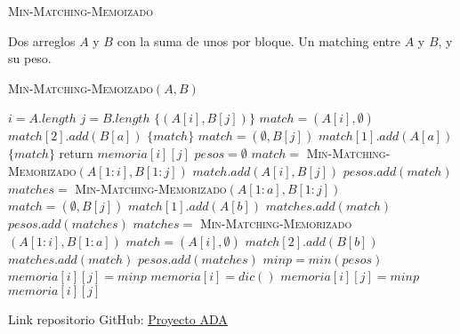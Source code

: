 \documentclass[conference]{IEEEtran}
\begin{document}
\begin{algorithm}
\caption{\textsc{Min-Matching-Memoizado}}
\begin{algorithmic}
\REQUIRE Dos arreglos $A$ y $B$ con la suma de unos por bloque.
\ENSURE Un matching entre $A$ y $B$, y su peso.
\begin{flushleft}
\textsc{Min-Matching-Memoizado}$(A,B)$
\end{flushleft}
    \STATE $i=A.length$
    \STATE $j=B.length$
        \RETURN $\{(A[i],B[j])\}$
            \STATE $match=(A[i],\emptyset)$
                \STATE $match[2].add(B[a])$
            \ENDFOR
            \RETURN $\{match\}$
        \ELSE
            \STATE $match=(\emptyset,B[j])$
                \STATE $match[1].add(A[a])$
            \ENDFOR
            \RETURN $\{match\}$
        \ENDIF
    \ELSE
                return $memoria[i][j]$
            \ENDIF
        \ENDIF
        \STATE $pesos=\emptyset$
        \STATE $match=$ \textsc{Min-Matching-Memorizado}$(A[1:i],B[1:j])$
        \STATE $match.add(A[i],B[j])$
        \STATE $pesos.add(match)$
            \STATE $matches=$ \textsc{Min-Matching-Memorizado}$(A[1:a],B[1:j])$
            \STATE $match=(\emptyset,B[j])$
                \STATE $match[1].add(A[b])$
            \ENDFOR
            \STATE $matches.add(match)$
            \STATE $pesos.add(matches)$
        \ENDFOR
            \STATE $matches=$ \textsc{Min-Matching-Memorizado}$(A[1:i],B[1:a])$
            \STATE $match=(A[i],\emptyset)$
                \STATE $match[2].add(B[b])$
            \ENDFOR
            \STATE $matches.add(match)$
            \STATE $pesos.add(matches)$
        \ENDFOR
        \STATE $minp = min(pesos)$
            \STATE $memoria[i][j] = minp$
        \ELSE
            \STATE $memoria[i] = dic()$
            \STATE $memoria[i][j] = minp$
        \ENDIF
        \RETURN $memoria[i][j]$
    \ENDIF
\end{algorithmic}
\end{algorithm}

\renewcommand{\appendixname}{Anexos}
\renewcommand{\appendixtocname}{Anexos}
\renewcommand{\appendixpagename}{Anexos}

\appendix
Link repositorio GitHub: \href{https://github.com/Piero16301/Proyecto_ADA.git}{\underline{Proyecto ADA}}
\end{document}

